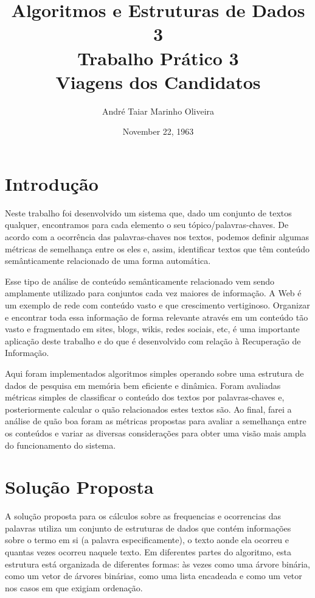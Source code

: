 \documentclass[12pt]{article}
\title{Algoritmos e Estruturas de Dados 3 \\ Trabalho Prático 3 \\
\huge{Viagens dos Candidatos}}
\date{November 22, 1963}
\author{André Taiar Marinho Oliveira}
\begin{document}
\maketitle

\begin{resumo}

\end{resumo}

\section{Introdução}

Neste trabalho foi desenvolvido um sistema que, dado um conjunto de textos
qualquer, encontramos para cada elemento o seu tópico/palavras-chaves. De acordo
com a ocorrência das palavras-chaves nos textos, podemos definir algumas
métricas de semelhança entre os eles e, assim, identificar 
textos que têm conteúdo semânticamente relacionado de uma forma automática.

Esse tipo de análise de conteúdo semânticamente relacionado vem sendo amplamente
utilizado para conjuntos cada vez maiores de informação. A Web é um exemplo de
rede com conteúdo vasto e que crescimento vertiginoso. Organizar e encontrar
toda essa informação de forma relevante através em um conteúdo tão vasto e
fragmentado em sites, blogs, wikis, redes sociais, etc, é uma importante
aplicação deste trabalho e do que é desenvolvido com relação à Recuperação de
Informação.

Aqui foram implementados algoritmos simples operando sobre uma estrutura de
dados de pesquisa em memória bem eficiente e dinâmica. Foram avaliadas métricas
simples de classificar o conteúdo dos textos por palavras-chaves e,
posteriormente calcular o quão relacionados estes textos são. Ao final, farei a
análise de quão boa foram as métricas propostas para avaliar a semelhança entre
os conteúdos e variar as diversas considerações para obter uma visão mais ampla
do funcionamento do sistema.

\section{Solução Proposta}
\label{solucao_proposta}

A solução proposta para os cálculos sobre as frequencias e ocorrencias das
palavras utiliza um conjunto de estruturas de dados que contém informações sobre
o termo em si (a palavra especificamente), o texto aonde ela ocorreu e quantas
vezes ocorreu naquele texto. Em diferentes partes do algoritmo, esta estrutura está
organizada de diferentes formas: às vezes como uma árvore binária, como um vetor
de árvores binárias, como uma lista encadeada e como um vetor nos casos em que
exigiam ordenação.
\end{document}
